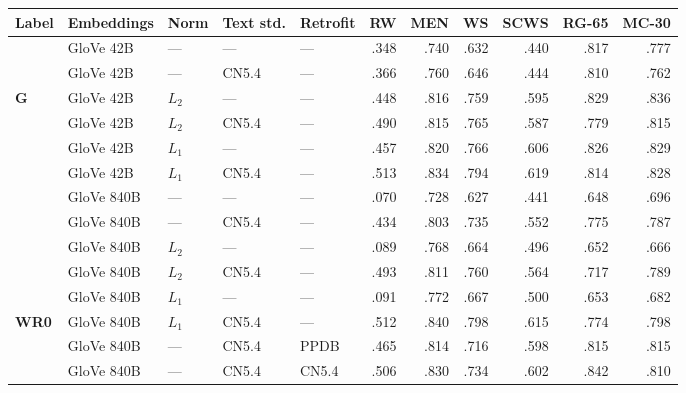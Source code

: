 \documentclass[11pt,letterpaper]{article}
\begin{document}
\begin{table*}[t]
\centering
\begin{tabular}{lllllrrrrrr}
\toprule
Label  &Embeddings   & Norm  & Text std. & Retrofit &       RW & MEN      &        WS &      SCWS &    RG-65 &    MC-30 \\
\midrule
       &GloVe 42B    & ---   & ---       & ---      &     .348 &     .740 &      .632 &      .440 &     .817 &     .777 \\
       &GloVe 42B    & ---   & CN5.4     & ---      &     .366 &     .760 &      .646 &      .444 &     .810 &     .762 \\
\bf G  &GloVe 42B    & $L_2$ & ---       & ---      &     .448 &     .816 &      .759 &      .595 &     .829 &     .836 \\
       &GloVe 42B    & $L_2$ & CN5.4     & ---      &     .490 &     .815 &      .765 &      .587 &     .779 &     .815 \\
       &GloVe 42B    & $L_1$ & ---       & ---      &     .457 &     .820 &      .766 &      .606 &     .826 &     .829 \\
       &GloVe 42B    & $L_1$ & CN5.4     & ---      &     .513 &     .834 &      .794 &      .619 &     .814 &     .828 \\
\midrule
       &GloVe 840B   & ---   & ---       & ---      &     .070 &     .728 &      .627 &      .441 &     .648 &     .696 \\
       &GloVe 840B   & ---   & CN5.4     & ---      &     .434 &     .803 &      .735 &      .552 &     .775 &     .787 \\
       &GloVe 840B   & $L_2$ & ---       & ---      &     .089 &     .768 &      .664 &      .496 &     .652 &     .666 \\
       &GloVe 840B   & $L_2$ & CN5.4     & ---      &     .493 &     .811 &      .760 &      .564 &     .717 &     .789 \\
       &GloVe 840B   & $L_1$ & ---       & ---      &     .091 &     .772 &      .667 &      .500 &     .653 &     .682 \\
\bf WR0&GloVe 840B   & $L_1$ & CN5.4     & ---      &     .512 &     .840 &      .798 &      .615 &     .774 &     .798 \\
\midrule
       &GloVe 840B   & ---   & CN5.4     & PPDB     &     .465 &     .814 &      .716 &      .598 &     .815 &     .815 \\
       &GloVe 840B   & ---   & CN5.4     & CN5.4    &     .506 &     .830 &      .734 &      .602 &     .842 &     .810 \\

\end{tabular}
\end{table*}
\end{document}
